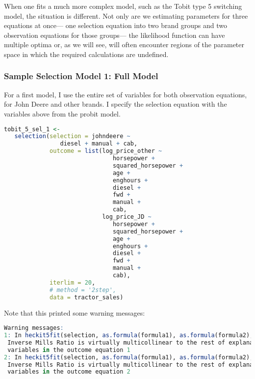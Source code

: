 \documentclass[11pt]{paper}
\begin{document}
When one fits a much more complex model, 
such as the Tobit type 5 switching model, 
the situation is different. 
Not only are we estimating parameters for three equations at once---%
one selection equation into two brand groups and two observation equations for those groups---%
the likelihood function can have multiple optima
or, as we will see, will often encounter regions of the parameter space in which the required calculations are undefined. 



\subsubsection{Sample Selection Model 1: Full Model}

For a first model, I use the entire set of variables
for both observation equations, for John Deere and other brands.
I specify the selection equation with the variables above
from the probit model.


\begin{lstlisting}[language=R]
tobit_5_sel_1 <-
   selection(selection = johndeere ~
                diesel + manual + cab,
             outcome = list(log_price_other ~
                               horsepower +
                               squared_horsepower +
                               age +
                               enghours +
                               diesel +
                               fwd +
                               manual +
                               cab,
                            log_price_JD ~
                               horsepower +
                               squared_horsepower +
                               age +
                               enghours +
                               diesel +
                               fwd +
                               manual +
                               cab),
             iterlim = 20,
             # method = '2step',
             data = tractor_sales)
\end{lstlisting}


Note that this printed some warning messages:


\begin{lstlisting}[language=R]
Warning messages:
1: In heckit5fit(selection, as.formula(formula1), as.formula(formula2),  :
 Inverse Mills Ratio is virtually multicollinear to the rest of explanatory
 variables in the outcome equation 1
2: In heckit5fit(selection, as.formula(formula1), as.formula(formula2),  :
 Inverse Mills Ratio is virtually multicollinear to the rest of explanatory
 variables in the outcome equation 2
\end{lstlisting}
\end{document}
